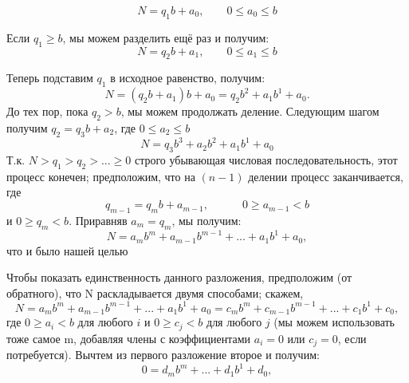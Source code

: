 \documentclass[11pt]{article}
\begin{document}
$$N = q_1b+a_0, \qquad 0 \leq a_{0}\leq b$$

Если $q_{1}\geq b $, мы можем разделить ещё раз и получим:
$$N = q_2b+a_1, \qquad 0 \leq a_{1}\leq b$$  

\thispagestyle{fancy}
\rhead{\thepage}
Теперь подставим $q_1$ в исходное равенство, получим: $$N = (q_{2}b+a_{1})b + a_{0} = q_{2}b^{2} + a_{1}b^{1} + a_{0} .$$
До тех пор, пока $q_{2}>b$, мы можем продолжать деление. Следующим шагом получим ${q_{2}=q_{3}b+a_{2}}$, где ${0\leq a_{2} \leq b}$   
$$N = q_{3}b^{3} + a_{2}b^{2} + a_{1}b^{1} + a_{0}$$
Т.к.  $N > q_{1} > q_{2} >...\geq 0$ строго убывающая числовая последовательность, этот процесс конечен; предположим, что на $(n-1)$ делении процесс заканчивается, где $$q_{m-1} = q_{m}b + a_{m-1}, \qquad \quad  0\geq a_{m-1}<b $$
и $0 \geq q_{m} < b$. Приравняв $a_{m} = q_{m}$, мы получим: $$N = a_{m}b^{m} + a_{m-1}b^{m-1} + ... +a_{1}b^{1} + a_{0},$$ что и было нашей целью

Чтобы показать единственность данного разложения, предположим (от обратного), что N раскладывается двумя способами; скажем,$$N = a_{m}b^{m} + a_{m-1}b^{m-1} + ... +a_{1}b^{1} + a_{0} = c_{m}b^{m} + c_{m-1}b^{m-1} + ... +c_{1}b^{1} + c_{0},$$ где $ 0 \geq a_{i} < b$ для любого $i$ и $0 \geq c_{j} < b$ для любого $j$ (мы можем использовать тоже самое m, добавляя члены с коэффициентами $a_{i} = 0$ или $c_{j} = 0$, если потребуется). Вычтем из первого разложение второе и получим: $$0 = d_{m}b^{m} + ... + d_{1}b^{1} + d_0,$$
 
\end{document}
